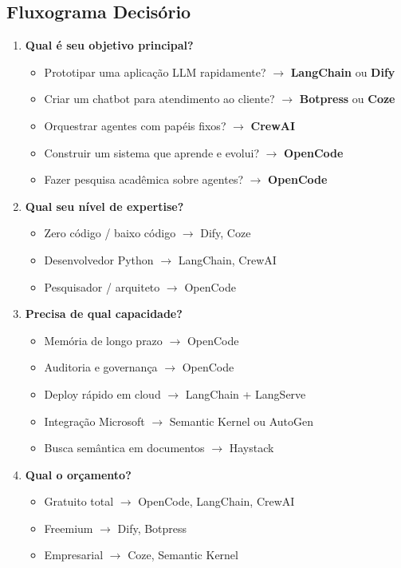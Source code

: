 \subsection{Fluxograma Decisório}

\newcommand{\decisionb}[1]{\textbf{#1}}

\begin{enumerate}
    \item \decisionb{Qual é seu objetivo principal?}
    \begin{itemize}
        \item Prototipar uma aplicação LLM rapidamente?
              $\rightarrow$ \textbf{LangChain} ou \textbf{Dify}
        \item Criar um chatbot para atendimento ao cliente?
              $\rightarrow$ \textbf{Botpress} ou \textbf{Coze}
        \item Orquestrar agentes com papéis fixos?
              $\rightarrow$ \textbf{CrewAI}
        \item Construir um sistema que aprende e evolui?
              $\rightarrow$ \textbf{OpenCode}
        \item Fazer pesquisa acadêmica sobre agentes?
              $\rightarrow$ \textbf{OpenCode}
    \end{itemize}

    \item \decisionb{Qual seu nível de expertise?}
    \begin{itemize}
        \item Zero código / baixo código $\rightarrow$ Dify, Coze
        \item Desenvolvedor Python $\rightarrow$ LangChain, CrewAI
        \item Pesquisador / arquiteto $\rightarrow$ OpenCode
    \end{itemize}

    \item \decisionb{Precisa de qual capacidade?}
    \begin{itemize}
        \item Memória de longo prazo $\rightarrow$ OpenCode
        \item Auditoria e governança $\rightarrow$ OpenCode
        \item Deploy rápido em cloud $\rightarrow$ LangChain + LangServe
        \item Integração Microsoft $\rightarrow$ Semantic Kernel ou AutoGen
        \item Busca semântica em documentos $\rightarrow$ Haystack
    \end{itemize}

    \item \decisionb{Qual o orçamento?}
    \begin{itemize}
        \item Gratuito total $\rightarrow$ OpenCode, LangChain, CrewAI
        \item Freemium $\rightarrow$ Dify, Botpress
        \item Empresarial $\rightarrow$ Coze, Semantic Kernel
    \end{itemize}
\end{enumerate}

